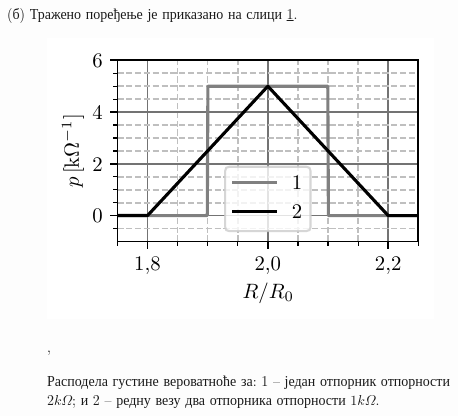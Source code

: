 (б) Тражено поређење је приказано на слици \ref{fig:\ID}.

\begin{figure}[ht!]
    \centering
    \includegraphics{fig/probabilities.pdf}
    \caption{
        Расподела густине вероватноће за: 1 -- један отпорник отпорности $2\unit{k\Omega}$; и
        2 -- редну везу два отпорника отпорности $1\unit{k\Omega}$.
    }, 
    \label{fig:\ID}

\end{figure}